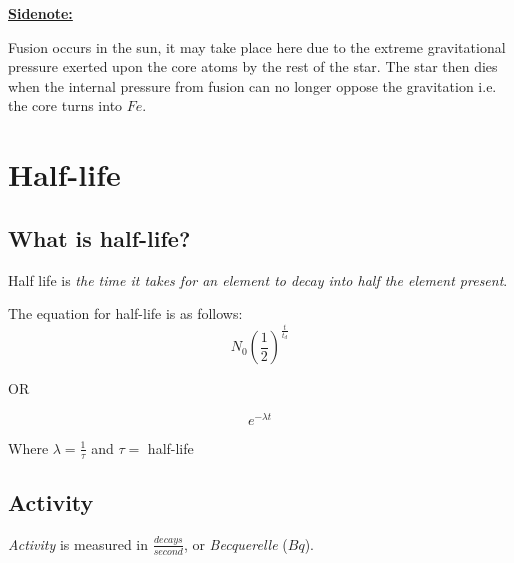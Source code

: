 \documentclass[12pt]{article}
\begin{document}
\begin{boxA}

	\textbf{\underline{Sidenote:}} \bigbreak

Fusion occurs in the sun, it may take place here due to the
extreme gravitational pressure exerted upon the core atoms
 by the rest of the star. The star then dies when the 
 internal pressure from fusion can no longer oppose the gravitation
 i.e. the core turns into $Fe$.

\end{boxA}

\newpage

\section{Half-life}

\subsection{What is half-life?}

Half life is \emph{the time it takes for an element to 
decay into half the element present}. \bigbreak

The equation for half-life is as follows: 
$$N_0\left(\frac{1}{2} \right)^\frac{t}{t_d}$$

\begin{center}
OR
\end{center}
$$e^{-\lambda t}$$ 

\begin{center}
Where $\lambda = \frac{1}{\tau}$ and $\tau=$ half-life
\end{center}
	\bigbreak

\begin{center}
\end{center}



\subsection{Activity}
\emph{Activity} is measured in $\frac{decays}{second}$, or 
\emph{Becquerelle} ($Bq$). \bigbreak
\end{document}
